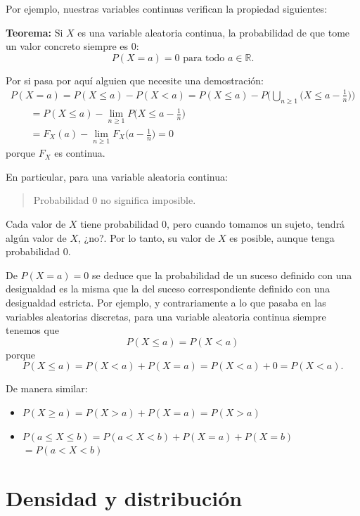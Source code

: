 \documentclass[
  spanish,
  letterpaper,
  DIV=11,
  numbers=noendperiod]{scrreprt}
\providecommand{\tightlist}{%
  \setlength{\itemsep}{0pt}\setlength{\parskip}{0pt}}
\begin{document}
Por ejemplo, nuestras variables continuas verifican la propiedad
siguientes:

\textbf{Teorema:} Si \(X\) es una variable aleatoria continua, la
probabilidad de que tome un valor concreto siempre es 0: \[
P(X=a)=0 \text{ para todo $a\in \mathbb{R}$}.
\]

Por si pasa por aquí alguien que necesite una demostración: \[
\begin{array}{l}
\displaystyle P(X=a) = P(X\leqslant a)-P(X<a)=P(X\leqslant a)-P\Big(\bigcup_{n\geqslant 1} \Big(X\leqslant a-\frac{1}{n}\Big)\Big)\\
\displaystyle \qquad= P(X\leqslant a)-\lim_{n\geqslant 1}P\Big(X\leqslant a-\frac{1}{n}\Big)\\
\displaystyle \qquad= F_X(a)-\lim_{n\geqslant 1}F_X\Big(a-\frac{1}{n}\Big)=0
\end{array}
\] porque \(F_X\) es continua.

En particular, para una variable aleatoria continua:

\begin{quote}
Probabilidad 0 no significa imposible.
\end{quote}

Cada valor de \(X\) tiene probabilidad 0, pero cuando tomamos un sujeto,
tendrá algún valor de \(X\), ¿no?. Por lo tanto, su valor de \(X\) es
posible, aunque tenga probabilidad 0.

De \(P(X=a)=0\) se deduce que la probabilidad de un suceso definido con
una desigualdad es la misma que la del suceso correspondiente definido
con una desigualdad estricta. Por ejemplo, y contrariamente a lo que
pasaba en las variables aleatorias discretas, para una variable
aleatoria continua siempre tenemos que \[
P(X\leqslant a)=P(X<a)
\] porque \[
P(X\leqslant a)=P(X<a)+P(X=a)=P(X<a)+0=P(X<a).
\]

De manera similar:

\begin{itemize}
\tightlist
\item
  \(P(X\geqslant a)=P(X> a)+P(X=a)=P(X> a)\)
\item
  \(P(a\leqslant X\leqslant b)=P(a<X<b)+P(X=a)+P(X=b)\) \(=P(a<X<b)\)
\end{itemize}

\section{Densidad y distribución}\label{densidad-y-distribuciuxf3n-1}
\end{document}
